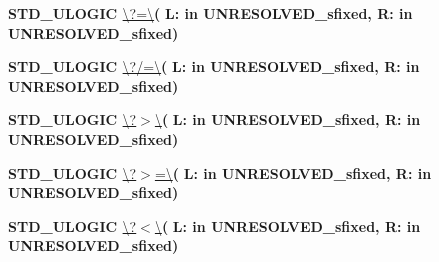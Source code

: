 \begin{DoxyCompactItemize}
\item 
{\bfseries {\bfseries \textcolor{comment}{S\+T\+D\+\_\+\+U\+L\+O\+G\+I\+C}\textcolor{vhdlchar}{ }}} \hyperlink{class__fixed__pkg_a8cb13e21bf841bcb05f30767ad54c888}{\textbackslash{}?=\textbackslash{}}{\bfseries  ( }{\bfseries \textcolor{vhdlchar}{L\+: }\textcolor{stringliteral}{in }\textcolor{vhdlchar}{U\+N\+R\+E\+S\+O\+L\+V\+E\+D\+\_\+sfixed}}{\bfseries  , \textcolor{vhdlchar}{R\+: }\textcolor{stringliteral}{in }\textcolor{vhdlchar}{U\+N\+R\+E\+S\+O\+L\+V\+E\+D\+\_\+sfixed}}{\bfseries  )} 
\item 
{\bfseries {\bfseries \textcolor{comment}{S\+T\+D\+\_\+\+U\+L\+O\+G\+I\+C}\textcolor{vhdlchar}{ }}} \hyperlink{class__fixed__pkg_a49424a53dc1761ab25455e586bd2412c}{\textbackslash{}?/=\textbackslash{}}{\bfseries  ( }{\bfseries \textcolor{vhdlchar}{L\+: }\textcolor{stringliteral}{in }\textcolor{vhdlchar}{U\+N\+R\+E\+S\+O\+L\+V\+E\+D\+\_\+sfixed}}{\bfseries  , \textcolor{vhdlchar}{R\+: }\textcolor{stringliteral}{in }\textcolor{vhdlchar}{U\+N\+R\+E\+S\+O\+L\+V\+E\+D\+\_\+sfixed}}{\bfseries  )} 
\item 
{\bfseries {\bfseries \textcolor{comment}{S\+T\+D\+\_\+\+U\+L\+O\+G\+I\+C}\textcolor{vhdlchar}{ }}} \hyperlink{class__fixed__pkg_a28cc0c1d8980098982ca0485b5f2fe71}{\textbackslash{}?$>$\textbackslash{}}{\bfseries  ( }{\bfseries \textcolor{vhdlchar}{L\+: }\textcolor{stringliteral}{in }\textcolor{vhdlchar}{U\+N\+R\+E\+S\+O\+L\+V\+E\+D\+\_\+sfixed}}{\bfseries  , \textcolor{vhdlchar}{R\+: }\textcolor{stringliteral}{in }\textcolor{vhdlchar}{U\+N\+R\+E\+S\+O\+L\+V\+E\+D\+\_\+sfixed}}{\bfseries  )} 
\item 
{\bfseries {\bfseries \textcolor{comment}{S\+T\+D\+\_\+\+U\+L\+O\+G\+I\+C}\textcolor{vhdlchar}{ }}} \hyperlink{class__fixed__pkg_a5e612bbbb0da47cd9a87053bf3bc3697}{\textbackslash{}?$>$=\textbackslash{}}{\bfseries  ( }{\bfseries \textcolor{vhdlchar}{L\+: }\textcolor{stringliteral}{in }\textcolor{vhdlchar}{U\+N\+R\+E\+S\+O\+L\+V\+E\+D\+\_\+sfixed}}{\bfseries  , \textcolor{vhdlchar}{R\+: }\textcolor{stringliteral}{in }\textcolor{vhdlchar}{U\+N\+R\+E\+S\+O\+L\+V\+E\+D\+\_\+sfixed}}{\bfseries  )} 
\item 
{\bfseries {\bfseries \textcolor{comment}{S\+T\+D\+\_\+\+U\+L\+O\+G\+I\+C}\textcolor{vhdlchar}{ }}} \hyperlink{class__fixed__pkg_abe3172f3a06b21b546baa6a7fc1f29c7}{\textbackslash{}?$<$\textbackslash{}}{\bfseries  ( }{\bfseries \textcolor{vhdlchar}{L\+: }\textcolor{stringliteral}{in }\textcolor{vhdlchar}{U\+N\+R\+E\+S\+O\+L\+V\+E\+D\+\_\+sfixed}}{\bfseries  , \textcolor{vhdlchar}{R\+: }\textcolor{stringliteral}{in }\textcolor{vhdlchar}{U\+N\+R\+E\+S\+O\+L\+V\+E\+D\+\_\+sfixed}}{\bfseries  )} 

\end{DoxyCompactItemize}
